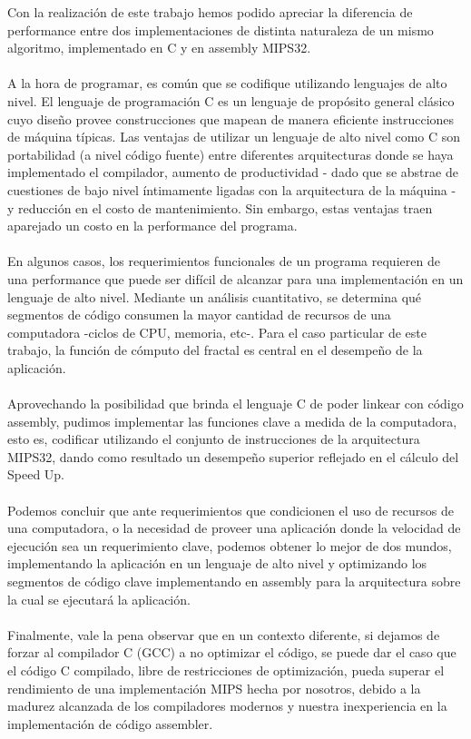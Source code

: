 \documentclass{article}
\begin{document}
Con la realización de este trabajo hemos podido apreciar la diferencia de performance entre dos implementaciones de distinta naturaleza de un mismo algoritmo, implementado en C y en assembly MIPS32.\\
\\
A la hora de programar, es común que se codifique utilizando lenguajes de alto nivel. El lenguaje de programación C es un lenguaje de propósito general clásico cuyo diseño provee construcciones que mapean de manera eficiente instrucciones de máquina típicas. Las ventajas de utilizar un lenguaje de alto nivel como C son portabilidad (a nivel código fuente) entre diferentes arquitecturas donde se haya implementado el compilador, aumento de productividad - dado que se abstrae de cuestiones de bajo nivel íntimamente ligadas con la arquitectura de la máquina - y reducción en el costo de mantenimiento. Sin embargo, estas ventajas traen aparejado un costo en la performance del programa.\\
\\
En algunos casos, los requerimientos funcionales de un programa requieren de una performance que puede ser difícil de alcanzar para una implementación en un lenguaje de alto nivel. Mediante un análisis cuantitativo, se determina qué segmentos de código consumen la mayor cantidad de recursos de una computadora -ciclos de CPU, memoria, etc-. Para el caso particular de este trabajo, la función de cómputo del fractal es central en el desempeño de la aplicación.\\
\\
Aprovechando la posibilidad que brinda el lenguaje C de poder linkear con código assembly, pudimos implementar las funciones clave a medida de la computadora, esto es, codificar utilizando el conjunto de instrucciones de la arquitectura MIPS32, dando como resultado un desempeño superior reflejado en el cálculo del Speed Up.\\
\\
Podemos concluir que ante requerimientos que condicionen el uso de recursos de una computadora, o la necesidad de proveer una aplicación donde la velocidad de ejecución sea un requerimiento clave, podemos obtener lo mejor de dos mundos, implementando la aplicación en un lenguaje de alto nivel y optimizando los segmentos de código clave implementando en assembly para la arquitectura sobre la cual se ejecutará la aplicación.\\
\\
Finalmente, vale la pena observar que en un contexto diferente, si dejamos de forzar al compilador C (GCC) a no optimizar el código, se puede dar el caso que el código C compilado, libre de restricciones de optimización, pueda superar el rendimiento de una implementación MIPS hecha por nosotros, debido a la madurez alcanzada de los compiladores modernos y nuestra inexperiencia en la implementación de código assembler.
\end{document}
